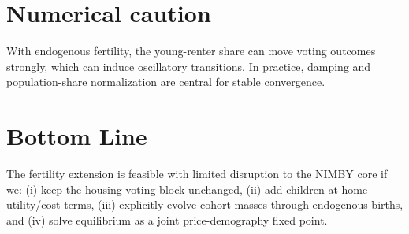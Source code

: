 \documentclass[11pt]{article}
\begin{document}
\section*{Numerical caution}
With endogenous fertility, the young-renter share can move voting outcomes strongly, which can induce oscillatory transitions. In practice, damping and population-share normalization are central for stable convergence.

\section*{Bottom Line}
The fertility extension is feasible with limited disruption to the NIMBY core if we: (i) keep the housing-voting block unchanged, (ii) add children-at-home utility/cost terms, (iii) explicitly evolve cohort masses through endogenous births, and (iv) solve equilibrium as a joint price-demography fixed point.
\end{document}
